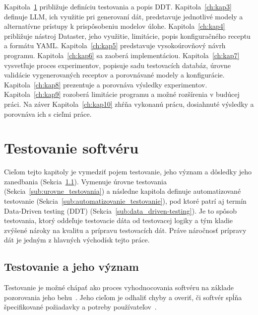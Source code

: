 Kapitola~\ref{ch:kap2} približuje definíciu testovania a popis DDT. Kapitola~\ref{ch:kap3} definuje LLM, ich využitie pri generovaní dát, predstavuje jednotlivé modely a alternatívne prístupy k prispôsobeniu modelov úlohe. Kapitola~\ref{ch:kap4} približuje nástroj Dataster, jeho využitie, limitácie, popis konfiguračného receptu a formátu YAML. Kapitola~\ref{ch:kap5} predstavuje vysokoúrovňový návrh programu. Kapitola~\ref{ch:kap6} sa zaoberá implementáciou. Kapitola~\ref{ch:kap7} vysvetľuje proces experimentov, popisuje sadu testovacích databáz, úrovne validácie vygenerovaných receptov a porovnávané modely a konfigurácie. Kapitola~\ref{ch:kap8} prezentuje a porovnáva výsledky experimentov. Kapitola~\ref{ch:kap9} rozoberá limitácie programu a možné rozšírenia v budúcej práci. Na záver Kapitola~\ref{ch:kap10} zhŕňa vykonanú prácu, dosiahnuté výsledky a porovnáva ich s cieľmi práce.


\chapter{Testovanie softvéru}
\label{ch:kap2}

Cieľom tejto kapitoly je vymedziť pojem testovanie, jeho význam a dôsledky jeho zanedbania (Sekcia~\ref{sub:testovanie_a_vyznam}). Vymenuje úrovne testovania (Sekcia~\ref{sub:urovne_testovania}) a následne kapitola definuje automatizované testovanie (Sekcia~\ref{sub:automatizovanie_testovanie}), pod ktoré patrí aj termín Data-Driven testing (DDT) (Sekcia~\ref{sub:data_driven-testing}). Je to spôsob testovania, ktorý oddeľuje testovacie dáta od testovacej logiky a tým kladie zvýšené nároky na kvalitu a prípravu testovacích dát. Práve náročnosť prípravy dát je jedným z hlavných východísk tejto práce.

\section{Testovanie a jeho význam}
\label{sub:testovanie_a_vyznam}
Testovanie je možné chápať ako proces vyhodnocovania softvéru na základe pozorovania jeho behu~\cite{Ammann2016}. Jeho cieľom je odhaliť chyby a overiť, či softvér spĺňa špecifikované požiadavky a potreby používateľov~\cite{Myers2011}.

